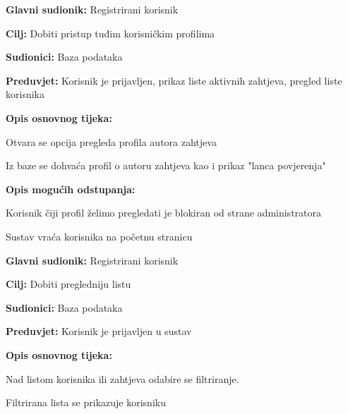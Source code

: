 \begin{packed_item}
	
	\item \textbf{Glavni sudionik: } Registrirani korisnik
	\item  \textbf{Cilj:} Dobiti pristup tuđim korisničkim profilima
	\item  \textbf{Sudionici:} Baza podataka
	\item  \textbf{Preduvjet:} Korisnik je prijavljen, prikaz liste aktivnih zahtjeva, pregled liste korisnika
	\item  \textbf{Opis osnovnog tijeka:}
	
	\item[] \begin{packed_enum}
		
		\item Otvara se opcija pregleda profila autora zahtjeva
		\item Iz baze se dohvaća profil o autoru zahtjeva kao i prikaz "lanca povjerenja"
	\end{packed_enum}
	\item  \textbf{Opis mogućih odstupanja:}
	
	\item[] \begin{packed_item}
		
		\item[1.a] Korisnik čiji profil želimo pregledati je blokiran od strane administratora
		\item[] \begin{packed_enum}
			
			\item Sustav vraća korisnika na početnu stranicu
			
		\end{packed_enum}
		
	\end{packed_item}
\end{packed_item}

\noindent {}
\begin{packed_item}
	
	\item \textbf{Glavni sudionik: } Registrirani korisnik
	\item  \textbf{Cilj:} Dobiti pregledniju listu 
	\item  \textbf{Sudionici:} Baza podataka
	\item  \textbf{Preduvjet:} Korisnik je prijavljen u sustav
	\item  \textbf{Opis osnovnog tijeka:}
	
	\item[] \begin{packed_enum}
		
		\item Nad listom korisnika ili zahtjeva odabire se filtriranje.
		\item Filtrirana lista se prikazuje korisniku
	\end{packed_enum}
	
\end{packed_item}

